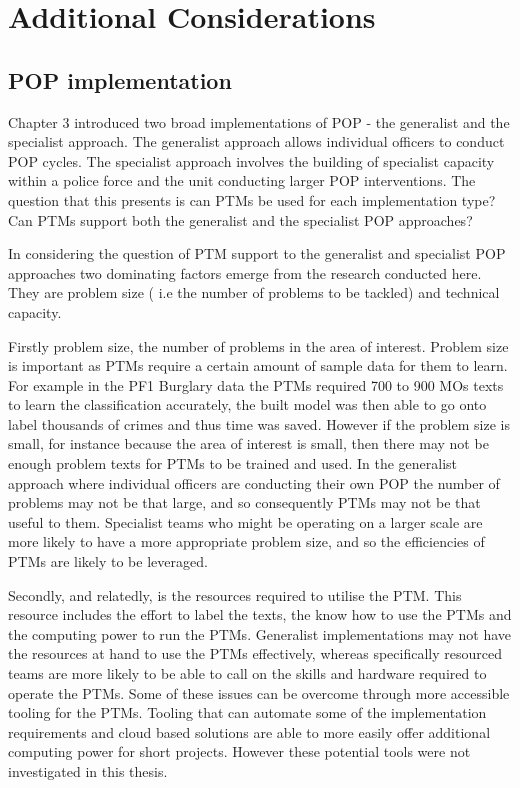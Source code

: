  
\section{Additional Considerations}
\subsection{POP implementation} Chapter 3 introduced two broad implementations of POP - the generalist and the specialist approach. The generalist approach allows individual officers to conduct POP cycles. The specialist approach involves the building of specialist capacity within a police force and the unit conducting larger POP interventions. The question that this presents is can PTMs be used for each implementation type? Can PTMs support both the generalist and the specialist POP approaches? 

In considering the question of PTM support to the generalist and specialist POP approaches two dominating factors emerge from the research conducted here. They are problem size ( i.e the number of problems to be tackled) and technical capacity. 

Firstly problem size, the number of problems in the area of interest. Problem size is important as PTMs require a certain amount of sample data for them to learn. For example in the PF1 Burglary data the PTMs required 700 to 900 MOs texts to learn the classification accurately, the built model was then able to go onto label thousands of crimes and thus time was saved. However if the problem size is small, for instance because the area of interest is small, then there may not be enough problem texts for PTMs to be trained and used.  In the generalist approach where individual officers are conducting their own POP the number of  problems may not be that large, and so consequently PTMs may not be that useful to them. Specialist teams who might be operating on a larger scale are more likely to have a more appropriate problem size, and so the efficiencies of PTMs are likely to be leveraged.  

Secondly, and relatedly, is the resources required to utilise the PTM. This resource includes the effort to label the texts, the know how to use the PTMs and the computing power to run the PTMs. Generalist implementations may not have the resources at hand to use the PTMs effectively, whereas specifically resourced teams are more likely to be able to call on the skills and hardware required to operate the PTMs. Some of these issues can be overcome through more accessible tooling for the PTMs. Tooling that can automate some of the implementation requirements and cloud based solutions are able to more easily offer additional computing power for short projects. However these potential tools were not investigated in this thesis.


